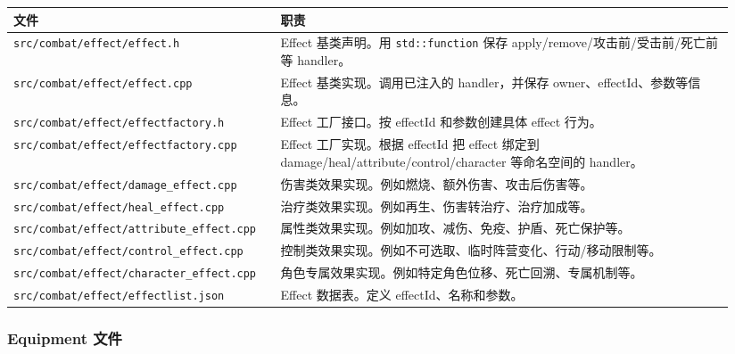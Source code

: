 \documentclass[UTF8,10pt]{ctexart}
\begin{document}
{\small
\begin{longtable}{p{0.34\linewidth}p{0.60\linewidth}}
\toprule
\textbf{文件} & \textbf{职责} \\
\midrule
\texttt{src/\allowbreak{}combat/\allowbreak{}effect/\allowbreak{}effect.\allowbreak{}h} & Effect 基类声明。用 \texttt{std::function} 保存 apply/remove/攻击前/受击前/死亡前等 handler。 \\
\texttt{src/\allowbreak{}combat/\allowbreak{}effect/\allowbreak{}effect.\allowbreak{}cpp} & Effect 基类实现。调用已注入的 handler，并保存 owner、effectId、参数等信息。 \\
\texttt{src/\allowbreak{}combat/\allowbreak{}effect/\allowbreak{}effectfactory.\allowbreak{}h} & Effect 工厂接口。按 effectId 和参数创建具体 effect 行为。 \\
\texttt{src/\allowbreak{}combat/\allowbreak{}effect/\allowbreak{}effectfactory.\allowbreak{}cpp} & Effect 工厂实现。根据 effectId 把 effect 绑定到 damage/heal/attribute/control/character 等命名空间的 handler。 \\
\texttt{src/\allowbreak{}combat/\allowbreak{}effect/\allowbreak{}damage\_\allowbreak{}effect.\allowbreak{}cpp} & 伤害类效果实现。例如燃烧、额外伤害、攻击后伤害等。 \\
\texttt{src/\allowbreak{}combat/\allowbreak{}effect/\allowbreak{}heal\_\allowbreak{}effect.\allowbreak{}cpp} & 治疗类效果实现。例如再生、伤害转治疗、治疗加成等。 \\
\texttt{src/\allowbreak{}combat/\allowbreak{}effect/\allowbreak{}attribute\_\allowbreak{}effect.\allowbreak{}cpp} & 属性类效果实现。例如加攻、减伤、免疫、护盾、死亡保护等。 \\
\texttt{src/\allowbreak{}combat/\allowbreak{}effect/\allowbreak{}control\_\allowbreak{}effect.\allowbreak{}cpp} & 控制类效果实现。例如不可选取、临时阵营变化、行动/移动限制等。 \\
\texttt{src/\allowbreak{}combat/\allowbreak{}effect/\allowbreak{}character\_\allowbreak{}effect.\allowbreak{}cpp} & 角色专属效果实现。例如特定角色位移、死亡回溯、专属机制等。 \\
\texttt{src/\allowbreak{}combat/\allowbreak{}effect/\allowbreak{}effectlist.\allowbreak{}json} & Effect 数据表。定义 effectId、名称和参数。 \\
\bottomrule
\end{longtable}
}

\subsubsection*{Equipment 文件}
\end{document}
